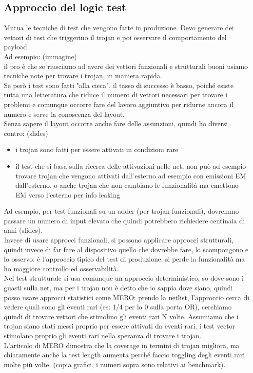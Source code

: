 \documentclass[oneside, 12pt]{extbook}
\begin{document}
\subsection{Approccio del logic test}
Mutua le tecniche di test che vengono fatte in produzione. Devo generare dei vettori di test che triggerino il trojan e poi osservare il comportamento del payload.\\Ad esempio: (immagine)\\il pro è che se riusciamo ad avere dei vettori funzionali e strutturali buoni usiamo tecniche note per trovare i trojan, in maniera rapida.\\Se però i test sono fatti "alla cieca", il tasso di successo è basso, poiché esiste tutta una letteratura che riduce il numero di vettori necessari per trovare i problemi e comunque occorre fare del lavoro aggiuntivo per ridurne ancora il numero e serve la conoscenza del layout.\\Senza sapere il layout occorre anche fare delle assunzioni, quindi ho diversi contro: (slides)
\begin{itemize}
	\item i trojan sono fatti per essere attivati in condizioni rare
	\item il test che si basa sulla ricerca delle attivazioni nelle net, non può ad esempio trovare trojan che vengono attivati dall'esterno ad esempio con emissioni EM dall'esterno, o anche trojan che non cambiano le funzionalità ma emettono EM verso l'esterno per info leaking
\end{itemize}
Ad esempio, per test funzionali su un adder (per trojan funzionali), dovremmo passare un numero di input elevato che quindi potrebbero richiedere centinaia di anni (slides).\\Invece di usare approcci funzionali, si possono applicare approcci strutturali, quindi invece di far fare al dispositivo quello che dovrebbe fare, lo scompongono e lo osservo: è l'approccio tipico del test di produzione, si perde la funzionalità ma ho maggiore controllo ed osservabilità.\\Nel test strutturale si usa comunque un approccio deterministico, so dove sono i guasti sulla net, ma per i trojan non è detto che io sappia dove siano, quindi posso usare approcci statistici come MERO: prendo la netlist, l'approccio cerca di vedere quali sono gli eventi rari (es: 1/4 per lo 0 sulla porta OR), cerchiamo quindi di trovare vettori che stimolino gli eventi rari N volte. Assumiamo che i trojan siano stati messi proprio per essere attivati da eventi rari, i test vector stimolano proprio gli eventi rari nella speranza di trovare i trojan.\\L'articolo di MERO dimostra che la coverage in termini di trojan migliora, ma chiaramente anche la test length aumenta perché faccio toggling degli eventi rari molte più volte. (copia grafici, i numeri sopra sono relativi ai benchmark).
\end{document}
